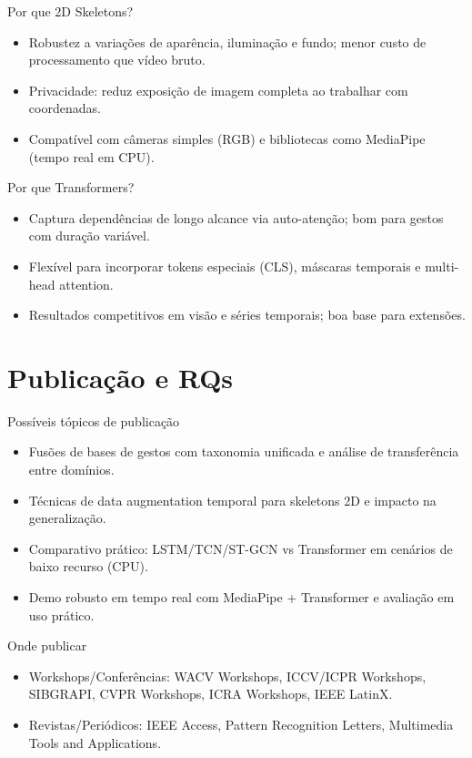 \documentclass[aspectratio=169]{beamer}
\begin{document}
\begin{frame}{Por que 2D Skeletons?}
  \begin{itemize}
    \item Robustez a variações de aparência, iluminação e fundo; menor custo de processamento que vídeo bruto.
    \item Privacidade: reduz exposição de imagem completa ao trabalhar com coordenadas.
    \item Compatível com câmeras simples (RGB) e bibliotecas como MediaPipe (tempo real em CPU).
  \end{itemize}
\end{frame}

\begin{frame}{Por que Transformers?}
  \begin{itemize}
    \item Captura dependências de longo alcance via auto-atenção; bom para gestos com duração variável.
    \item Flexível para incorporar tokens especiais (CLS), máscaras temporais e multi-head attention.
    \item Resultados competitivos em visão e séries temporais; boa base para extensões.
  \end{itemize}
\end{frame}

\section{Publicação e RQs}
\begin{frame}{Possíveis tópicos de publicação}
  \begin{itemize}
    \item Fusões de bases de gestos com taxonomia unificada e análise de transferência entre domínios.
    \item Técnicas de data augmentation temporal para skeletons 2D e impacto na generalização.
    \item Comparativo prático: LSTM/TCN/ST-GCN vs Transformer em cenários de baixo recurso (CPU).
    \item Demo robusto em tempo real com MediaPipe + Transformer e avaliação em uso prático.
  \end{itemize}
\end{frame}

\begin{frame}{Onde publicar}
  \begin{itemize}
    \item Workshops/Conferências: WACV Workshops, ICCV/ICPR Workshops, SIBGRAPI, CVPR Workshops, ICRA Workshops, IEEE LatinX.
    \item Revistas/Periódicos: IEEE Access, Pattern Recognition Letters, Multimedia Tools and Applications.
  \end{itemize}
\end{frame}
\end{document}
